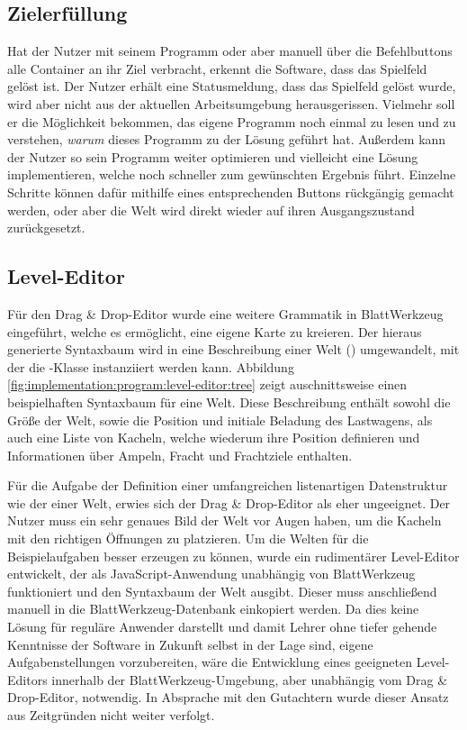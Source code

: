 \subsection{Zielerfüllung}
\label{sec:implementation:program:finish}

Hat der Nutzer mit seinem Programm oder aber manuell über die Befehlbuttons alle Container an ihr Ziel verbracht, erkennt die Software, dass das Spielfeld gelöst ist. Der Nutzer erhält eine Statusmeldung, dass das Spielfeld gelöst wurde, wird aber nicht aus der aktuellen Arbeitsumgebung herausgerissen. Vielmehr soll er die Möglichkeit bekommen, das eigene Programm noch einmal zu lesen und zu verstehen, \emph{warum} dieses Programm zu der Lösung geführt hat. Außerdem kann der Nutzer so sein Programm weiter optimieren und vielleicht eine Lösung implementieren, welche noch schneller zum gewünschten Ergebnis führt. Einzelne Schritte können dafür mithilfe eines entsprechenden Buttons rückgängig gemacht werden, oder aber die Welt wird direkt wieder auf ihren Ausgangszustand zurückgesetzt.

\subsection{Level-Editor}
\label{sec:implementation:program:level-editor}

Für den Drag \& Drop-Editor wurde eine weitere Grammatik in BlattWerkzeug eingeführt, welche es ermöglicht, eine eigene Karte zu kreieren. Der hieraus generierte Syntaxbaum wird in eine Beschreibung einer Welt () umgewandelt, mit der die -Klasse instanziiert werden kann. Abbildung \ref{fig:implementation:program:level-editor:tree} zeigt auschnittsweise einen beispielhaften Syntaxbaum für eine Welt. Diese Beschreibung enthält sowohl die Größe der Welt, sowie die Position und initiale Beladung des Lastwagens, als auch eine Liste von Kacheln, welche wiederum ihre Position definieren und Informationen über Ampeln, Fracht und Frachtziele enthalten.

Für die Aufgabe der Definition einer umfangreichen listenartigen Datenstruktur wie der einer Welt, erwies sich der Drag \& Drop-Editor als eher ungeeignet. Der Nutzer muss ein sehr genaues Bild der Welt vor Augen haben, um die Kacheln mit den richtigen Öffnungen zu platzieren. Um die Welten für die Beispielaufgaben besser erzeugen zu können, wurde ein rudimentärer Level-Editor entwickelt, der als JavaScript-Anwendung unabhängig von BlattWerkzeug funktioniert und den Syntaxbaum der Welt ausgibt. Dieser muss anschließend manuell in die BlattWerkzeug-Datenbank einkopiert werden. Da dies keine Lösung für reguläre Anwender darstellt und damit Lehrer ohne tiefer gehende Kenntnisse der Software in Zukunft selbst in der Lage sind, eigene Aufgabenstellungen vorzubereiten, wäre die Entwicklung eines geeigneten Level-Editors innerhalb der BlattWerkzeug-Umgebung, aber unabhängig vom Drag \& Drop-Editor, notwendig. In Absprache mit den Gutachtern wurde dieser Ansatz aus Zeitgründen nicht weiter verfolgt.

